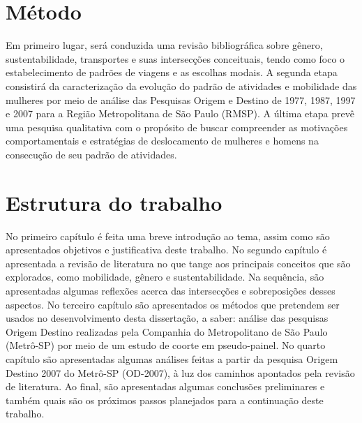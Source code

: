 \section{Método}

Em primeiro lugar, será conduzida uma revisão bibliográfica sobre gênero, sustentabilidade, transportes e suas intersecções conceituais, tendo como foco o estabelecimento de padrões de viagens e as escolhas modais.
A segunda etapa consistirá da caracterização da evolução do padrão de atividades e mobilidade das mulheres por meio de análise das Pesquisas Origem e Destino de 1977, 1987, 1997 e 2007 para a Região Metropolitana de São Paulo (RMSP).
A última etapa prevê uma pesquisa qualitativa com o propósito de buscar compreender as motivações comportamentais e estratégias de deslocamento de mulheres e homens na consecução de seu padrão de atividades.

\section{Estrutura do trabalho}

No primeiro capítulo é feita uma breve introdução ao tema, assim como são apresentados objetivos e justificativa deste trabalho.
No segundo capítulo é apresentada a revisão de literatura no que tange aos principais conceitos que são explorados, como mobilidade, gênero e sustentabilidade. Na sequência, são apresentadas algumas reflexões acerca das intersecções e sobreposições desses aspectos.
No terceiro capítulo são apresentados os métodos que pretendem ser usados no desenvolvimento desta dissertação, a saber: análise das pesquisas Origem Destino realizadas pela Companhia do Metropolitano de São Paulo (Metrô-SP) por meio de um estudo de coorte em pseudo-painel.
No quarto capítulo são apresentadas algumas análises feitas a partir da pesquisa Origem Destino 2007 do Metrô-SP (OD-2007), à luz dos caminhos apontados pela revisão de literatura.
Ao final, são apresentadas algumas conclusões preliminares e também quais são os próximos passos planejados para a continuação deste trabalho.
